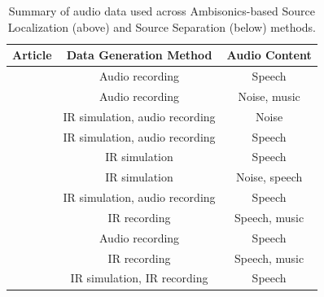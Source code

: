 \begin{table}[htpb]
    \centering
    \footnotesize

	\begin{tabular}{ ccc }
    \toprule
    
    Article &
    Data Generation Method &
    Audio Content\\
    \midrule
    
    \cite{thiergart_localization_2009}
    & Audio recording 
    & Speech\\
    
    \cite{Tervo2009}
    & Audio recording
    & Noise, music\\
    
    \cite{Jarrett2010} 
    & IR simulation, audio recording
    & Noise\\
    
    \cite{Nadiri2014}   
    & IR simulation, audio recording
    & Speech\\
    
    \cite{Moore2015}   
    & IR simulation 
    & Speech\\
    
    \cite{Pavlidi2015}
    & IR simulation 
    & Noise, speech\\
    
    \cite{He2017}   
    & IR simulation, audio recording
    & Speech\\
    
    
    \midrule
    
    \cite{Gunel2008}
    & IR recording
    & Speech, music\\
    
    \cite{Shujau2011} 
    & Audio recording
    & Speech\\
    
    \cite{Riaz2015}
    & IR recording
    & Speech, music\\
    
    \cite{Chen2015}
    & IR simulation, IR recording
    & Speech\\

    \bottomrule
    \end{tabular}
    \caption{Summary of audio data used across Ambisonics-based Source Localization (above) and Source Separation (below) methods.}
    \label{table:evaluationdata}
\end{table}

